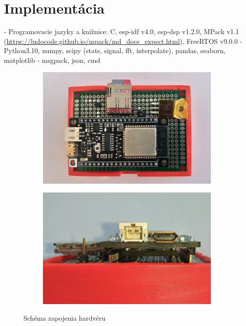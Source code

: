 \chapter{Implementácia}
- Programovacie jazyky a knižnice: 
	C, esp-idf v4.0, esp-dsp v1.2.0, MPack v1.1 (\url{https://ludocode.github.io/mpack/md_docs_expect.html}), FreeRTOS v9.0.0
- Python3.10, numpy, scipy (stats, signal, fft, interpolate), pandas, seaborn, matplotlib
- msgpack, json, cmd


\begin{figure}[h]
\centering
\begin{subfigure}[b]{0.65\textwidth}
    \centering
    \includegraphics[width=\textwidth]{figures/design/esp32.jpg}
\end{subfigure}
\hfill
\begin{subfigure}[b]{0.3\textwidth}
    \centering
    \includegraphics[width=\textwidth]{figures/design/esp32-front.jpg}
\end{subfigure}
\label{schematics}
\caption{Schéma zapojenia hardvéru}
\end{figure}

